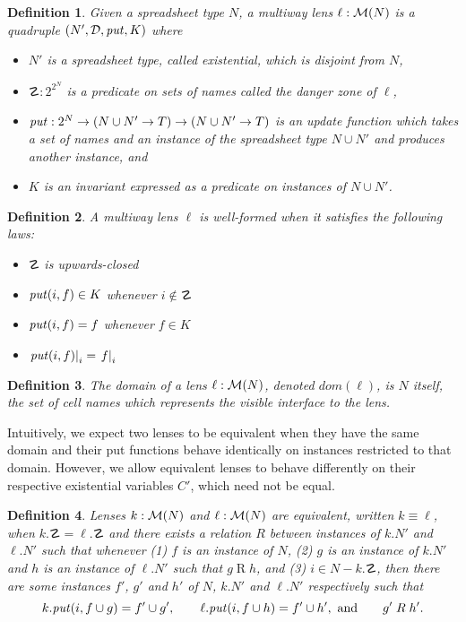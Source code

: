 \documentclass{article}
\newtheorem{definition}{Definition}
\begin{document}
\begin{definition}
    Given a spreadsheet type $N$, a \emph{multiway lens} $\ell : \mathcal M(N)$
    is a quadruple $(N',\mathcal D,\mathit{put},K)$ where
    \begin{itemize}
        \item $N'$ is a spreadsheet type, called \emph{existential}, which is disjoint from $N$,
        \item $\danger : 2^{2^N}$ is a predicate on sets of names called the \emph{danger
            zone} of $\ell$,
        \item $\mathit{put} : 2^N \to (N \cup N' \to T) \to (N \cup N' \to T)$ is
            an update function which takes a set of names and an instance of
            the spreadsheet type $N \cup N'$ and produces another instance,
            and
        \item $K$ is an invariant expressed as a predicate on instances of
            $N \cup N'$.
    \end{itemize}
\end{definition}

\begin{definition}
    A multiway lens $\ell$ is \emph{well-formed} when it satisfies the
    following laws:
    \begin{itemize}
        \item $\danger$ is upwards-closed
        \item $\mathit{put}(i,f) \in K$ whenever $i \notin \danger$
        \item $\mathit{put}(i,f) = f$ whenever $f \in K$
        \item $\left.\mathit{put}(i,f)\right|_i = \left.f\right|_i$
    \end{itemize}
\end{definition}

\newcommand{\mdomain}[1]{\mathit{dom}(#1)}
\begin{definition}
    The \emph{domain} of a lens $\ell : \mathcal M(N)$, denoted $\mdomain\ell$, is
    $N$ itself, the set of cell names which represents the visible
    interface to the lens.
\end{definition}

Intuitively, we expect two lenses to be equivalent when they have the
same domain and their put functions behave identically on instances
restricted to that domain. However, we allow equivalent lenses to 
behave differently on their respective existential variables $C'$,
which need not be equal. 
\begin{definition}
    Lenses $k : \mathcal M(N)$ and $\ell : \mathcal M(N)$ are \emph{equivalent},
    written $k \equiv \ell$, when $k.\danger = \ell.\danger$ and there
    exists a relation $R$ between instances of $k.N'$ and $\ell.N'$ such
    that whenever (1) $f$ is an instance of $N$, (2) $g$ is an instance of $k.N'$
    and $h$ is an instance of $\ell.N'$ such that $g \mathrel R h$,
    and (3) $i\in N - k.\danger$, then there are some instances $f'$, $g'$ and
    $h'$ of $N$, $k.N'$ and $\ell.N'$ respectively such that
    \[k.\mathit{put}(i,f\cup g) = f' \cup g', \qquad
      \ell.\mathit{put}(i,f\cup h) = f' \cup h', \text{ and} \qquad
      g' \mathrel R h'. \]
\end{definition}
\end{document}
